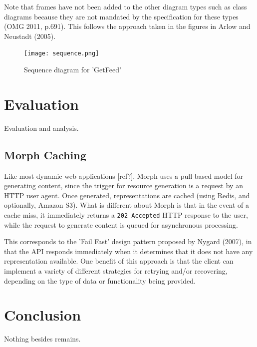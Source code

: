 \documentclass{article}
\begin{document}
Note that frames have not been added to the other diagram types such as class diagrams because they are not mandated by the specification for these types (OMG 2011, p.691). This follows the approach taken in the figures in Arlow and Neustadt (2005).

\begin{figure}
  \begin{center}
    \texttt{[image: sequence.png]}
  \end{center}
  \label{sequence-diagram}
  \caption{Sequence diagram for 'GetFeed'}
\end{figure}

\clearpage

\section{Evaluation}
Evaluation and analysis.

\subsection{Morph Caching}

Like most dynamic web applications [ref?], Morph uses a pull-based model for generating content, since the trigger for resource generation is a request by an HTTP user agent. Once generated, representations are cached (using Redis, and optionally, Amazon S3). What is different about Morph is that in the event of a cache miss, it immediately returns a \texttt{202 Accepted} HTTP response to the user, while the request to generate content is queued for asynchronous processing. 

This corresponds to the 'Fail Fast' design pattern proposed by Nygard (2007), in that the API responds immediately when it determines that it does not have any representation available. One benefit of this approach is that the client can implement a variety of different strategies for retrying and/or recovering, depending on the type of data or functionality being provided.



\section{Conclusion}
Nothing besides remains.
\end{document}
